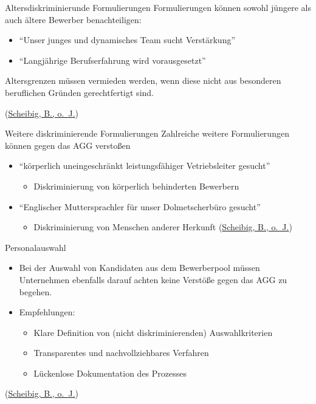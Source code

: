 \documentclass[
  10pt,
  ignorenonframetext,
]{beamer}
\providecommand{\tightlist}{%
  \setlength{\itemsep}{0pt}\setlength{\parskip}{0pt}}
\begin{document}
\begin{frame}{Altersdiskriminierunde Formulierungen}
\protect\hypertarget{altersdiskriminierunde-formulierungen}{}
Formulierungen können sowohl jüngere als auch ältere Bewerber
benachteiligen:

\begin{itemize}
\tightlist
\item
  ``Unser junges und dynamisches Team sucht Verstärkung''
\item
  ``Langjährige Berufserfahrung wird vorausgesetzt''
\end{itemize}

Altersgrenzen müssen vermieden werden, wenn diese nicht aus besonderen
beruflichen Gründen gerechtfertigt sind.

(\protect\hyperlink{ref-ihk_wsb}{Scheibig, B., o.~J.})
\end{frame}

\begin{frame}{Weitere diskriminierende Formulierungen}
\protect\hypertarget{weitere-diskriminierende-formulierungen}{}
Zahlreiche weitere Formulierungen können gegen das AGG verstoßen

\begin{itemize}
\tightlist
\item
  ``körperlich uneingeschränkt leistungsfähiger Vetriebsleiter gesucht''

  \begin{itemize}
  \tightlist
  \item
    Diskriminierung von körperlich behinderten Bewerbern
  \end{itemize}
\item
  ``Englischer Muttersprachler für unser Dolmetscherbüro gesucht''

  \begin{itemize}
  \tightlist
  \item
    Diskriminierung von Menschen anderer Herkunft
    (\protect\hyperlink{ref-ihk_wsb}{Scheibig, B., o.~J.})
  \end{itemize}
\end{itemize}
\end{frame}

\begin{frame}{Personalauswahl}
\protect\hypertarget{personalauswahl}{}
\begin{itemize}
\item
  Bei der Auswahl von Kandidaten aus dem Bewerberpool müssen Unternehmen
  ebenfalls darauf achten keine Verstöße gegen das AGG zu begehen.
\item
  Empfehlungen:

  \begin{itemize}
  \tightlist
  \item
    Klare Definition von (nicht diskriminierenden) Auswahlkriterien
  \item
    Transparentes und nachvollziehbares Verfahren
  \item
    Lückenlose Dokumentation des Prozesses
  \end{itemize}
\end{itemize}

(\protect\hyperlink{ref-ihk_wsb}{Scheibig, B., o.~J.})
\end{frame}
\end{document}

